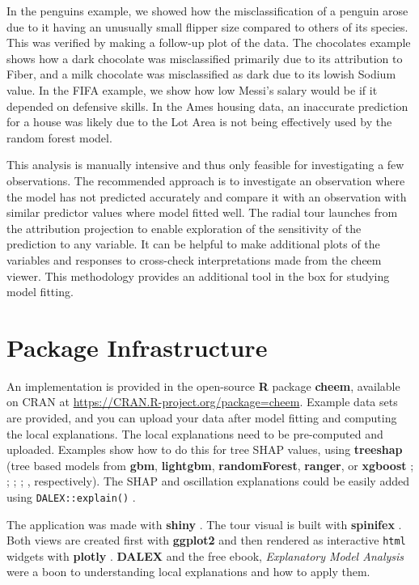 \documentclass[
]{jss}
\begin{document}
In the penguins example, we showed how the misclassification of a penguin arose due to it having an unusually small flipper size compared to others of its species. This was verified by making a follow-up plot of the data. The chocolates example shows how a dark chocolate was misclassified primarily due to its attribution to Fiber, and a milk chocolate was misclassified as dark due to its lowish Sodium value. In the FIFA example, we show how low Messi's salary would be if it depended on defensive skills. In the Ames housing data, an inaccurate prediction for a house was likely due to the Lot Area is not being effectively used by the random forest model.

This analysis is manually intensive and thus only feasible for investigating a few observations. The recommended approach is to investigate an observation where the model has not predicted accurately and compare it with an observation with similar predictor values where model fitted well. The radial tour launches from the attribution projection to enable exploration of the sensitivity of the prediction to any variable. It can be helpful to make additional plots of the variables and responses to cross-check interpretations made from the cheem viewer. This methodology provides an additional tool in the box for studying model fitting.

\hypertarget{sec:infrastructure}{%
\section{Package Infrastructure}\label{sec:infrastructure}}

An implementation is provided in the open-source \textbf{R} package \textbf{cheem}, available on CRAN at \url{https://CRAN.R-project.org/package=cheem}. Example data sets are provided, and you can upload your data after model fitting and computing the local explanations. The local explanations need to be pre-computed and uploaded. Examples show how to do this for tree SHAP values, using \textbf{treeshap} (tree based models from \textbf{gbm}, \textbf{lightgbm}, \textbf{randomForest}, \textbf{ranger}, or \textbf{xgboost} \citet{greenwell_gbm_2020}; \citet{shi_lightgbm_2022}; \citet{liaw_classification_2002}; \citet{wright_ranger_2017}; \citet{chen_xgboost_2021}, respectively). The SHAP and oscillation explanations could be easily added using \texttt{DALEX::explain()} \citep{biecek_dalex_2018, biecek_explanatory_2021}.

The application was made with \textbf{shiny} \citep{chang_shiny_2021}. The tour visual is built with \textbf{spinifex} \citep{spyrison_spinifex_2020}. Both views are created first with \textbf{ggplot2} \citep{wickham_ggplot2_2016} and then rendered as interactive \texttt{html} widgets with \textbf{plotly} \citep{sievert_interactive_2020}. \textbf{DALEX} \citep{biecek_dalex_2018} and the free ebook, \emph{Explanatory Model Analysis} \citep{biecek_explanatory_2021} were a boon to understanding local explanations and how to apply them.
\end{document}
